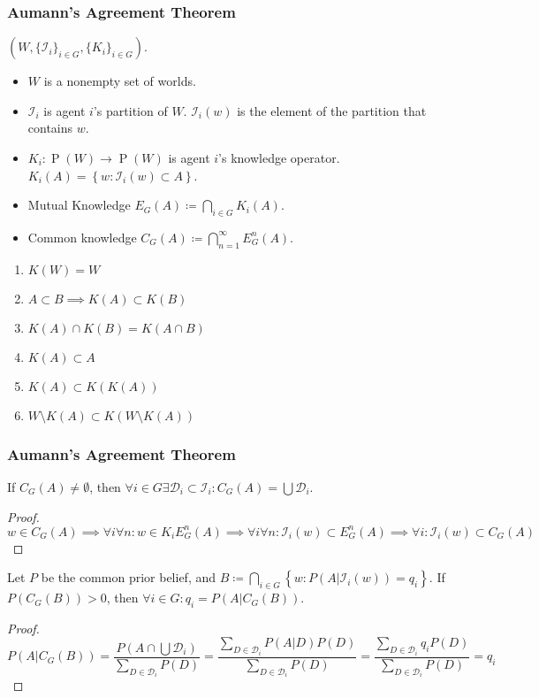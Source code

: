 \documentclass[UTF8,11pt,colorlinks,compress,openany]{beamer}%
\begin{document}
\begin{frame}\frametitle{Aumann's Agreement Theorem}
$\left(W,\{\mathcal{I}_i\}_{i\in G},\{K_i\}_{i\in G}\right)$.
\begin{itemize}
\item $W$ is a nonempty set of worlds.\\
\item $\mathcal{I}_i$ is agent $i$'s partition of $W$. $\mathcal{I}_i(w)$ is the element of the partition that contains $w$.\\
\item $K_i: \operatorname{P}(W)\to \operatorname{P}(W)$ is agent $i$'s knowledge operator. 
$K_i(A)=\left\{w: \mathcal{I}_i(w)\subset A\right\}$.\\
\item Mutual Knowledge $E_G(A)\coloneqq \bigcap\limits_{i\in G}K_i(A)$.\\
\item Common knowledge $C_G(A)\coloneqq \bigcap\limits_{n=1}^\infty E_G^n(A)$.
\end{itemize}
\begin{enumerate}
	\item $K(W)=W$
	\item $A\subset B\implies K(A)\subset K(B)$
	\item $K(A)\cap K(B)=K(A\cap B)$
	\item $K(A)\subset A$
	\item $K(A)\subset K(K(A))$
	\item $W\setminus K(A)\subset K(W\setminus K(A))$
\end{enumerate}
\end{frame}

\begin{frame}\frametitle{Aumann's Agreement Theorem}
\setlength\abovedisplayskip{0pt}
\setlength\belowdisplayskip{0pt}
\begin{lemma}
If $C_G(A)\ne\emptyset$, then $\forall i\in G\exists \mathcal{D}_i\subset \mathcal{I}_i: C_G(A)=\bigcup \mathcal{D}_i$.
\end{lemma}
\begin{proof}
$w\in C_G(A)\implies\forall i\forall n: w\in K_iE_G^n(A)\implies\forall i\forall n: \mathcal{I}_i(w)\subset E_G^n(A)\implies\forall i: \mathcal{I}_i(w)\subset C_G(A)$
\end{proof}
\begin{theorem}
Let $P$ be the common prior belief, and $B\coloneqq \bigcap\limits_{i\in G}\left\{w: P(A|\mathcal{I}_i(w))=q_i\right\}$. If $P\left(C_G(B)\right)>0$, then $\forall i\in G: q_i=P(A|C_G(B))$.
\end{theorem}
\begin{proof}
\[P(A|C_G(B))=\frac{P(A\cap\bigcup \mathcal{D}_i)}{\sum\limits_{D\in\mathcal{D}_i}P(D)}=\frac{\sum\limits_{D\in \mathcal{D}_i}P(A|D)P(D)}{\sum\limits_{D\in \mathcal{D}_i}P(D)}=\frac{\sum\limits_{D\in\mathcal{D}_i}q_iP(D)}{\sum\limits_{D\in \mathcal{D}_i}P(D)}=q_i\]
\end{proof}
\end{frame}
\end{document}
